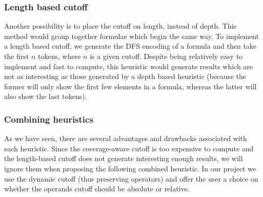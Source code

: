 \documentclass[a4paper,oneside]{article}
\begin{document}
\subsubsection{Length based cutoff}\label{subsubsec:length_based_cutoff}
Another possibility is to place the cutoff on length, instead of depth. This
method would group together formulae which begin the same way. To implement
a length based cutoff, we generate the DFS encoding of a formula and then take
the first $n$ tokens, where $n$ is a given cutoff. Despite being relatively
easy to implement and fast to compute, this heuristic would generate results
which are not as interesting as those generated by a depth based heuristic
(because the former will only show the first few elements in a formula, whereas
the latter will also show the last tokens).

\subsubsection{Combining heuristics}\label{subsubsec:combining_cutoffs}
As we have seen, there are several advantages and drawbacks associated with
each heuristic. Since the coverage-aware cutoff is too expensive to compute and
the length-based cutoff does not generate interesting enough results, we
will ignore them when proposing the following combined heuristic. In our
project we use the dynamic cutoff (thus preserving operators) and offer the
user a choice on whether the operands cutoff should be absolute or relative.
\end{document}
